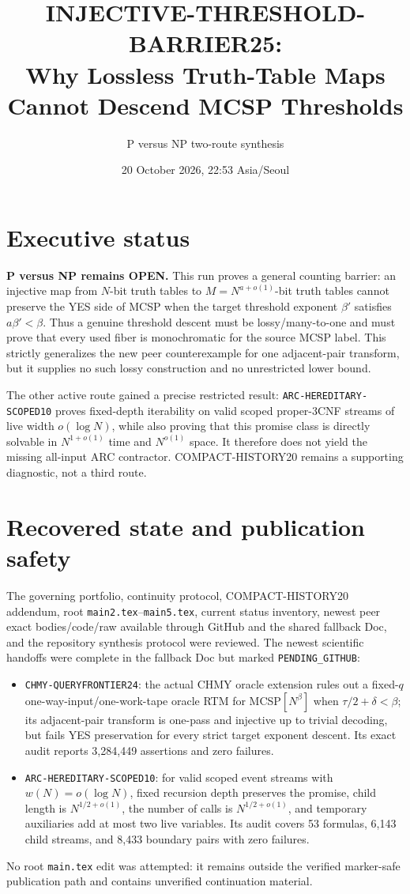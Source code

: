 \documentclass[11pt]{article}
\title{INJECTIVE-THRESHOLD-BARRIER25:\\Why Lossless Truth-Table Maps Cannot Descend MCSP Thresholds}
\author{P versus NP two-route synthesis}
\date{20 October 2026, 22:53 Asia/Seoul}
\begin{document}
\maketitle

\section*{Executive status}
\textbf{P versus NP remains OPEN.} This run proves a general counting barrier:
an injective map from $N$-bit truth tables to $M=N^{a+o(1)}$-bit truth tables
cannot preserve the YES side of MCSP when the target threshold exponent
$\beta'$ satisfies $a\beta'<\beta$.  Thus a genuine threshold descent must be
lossy/many-to-one and must prove that every used fiber is monochromatic for
the source MCSP label.  This strictly generalizes the new peer counterexample
for one adjacent-pair transform, but it supplies no such lossy construction
and no unrestricted lower bound.

The other active route gained a precise restricted result:
\texttt{ARC-HEREDITARY-SCOPED10} proves fixed-depth iterability on valid
scoped proper-3CNF streams of live width $o(\log N)$, while also proving that
this promise class is directly solvable in $N^{1+o(1)}$ time and $N^{o(1)}$
space.  It therefore does not yield the missing all-input ARC contractor.
COMPACT-HISTORY20 remains a supporting diagnostic, not a third route.

\section*{Recovered state and publication safety}
The governing portfolio, continuity protocol, COMPACT-HISTORY20 addendum,
root \texttt{main2.tex}--\texttt{main5.tex}, current status inventory, newest
peer exact bodies/code/raw available through GitHub and the shared fallback
Doc, and the repository synthesis protocol were reviewed.  The newest
scientific handoffs were complete in the fallback Doc but marked
\texttt{PENDING\_GITHUB}:
\begin{itemize}
\item \texttt{CHMY-QUERYFRONTIER24}: the actual CHMY oracle extension rules
out a fixed-$q$ one-way-input/one-work-tape oracle RTM for MCSP$[N^\beta]$
when $\tau/2+\delta<\beta$; its adjacent-pair transform is one-pass and
injective up to trivial decoding, but fails YES preservation for every
strict target exponent descent.  Its exact audit reports 3,284,449
assertions and zero failures.
\item \texttt{ARC-HEREDITARY-SCOPED10}: for valid scoped event streams with
$w(N)=o(\log N)$, fixed recursion depth preserves the promise, child length
is $N^{1/2+o(1)}$, the number of calls is $N^{1/2+o(1)}$, and temporary
auxiliaries add at most two live variables.  Its audit covers 53 formulas,
6,143 child streams, and 8,433 boundary pairs with zero failures.
\end{itemize}
No root \texttt{main.tex} edit was attempted: it remains outside the verified
marker-safe publication path and contains unverified continuation material.
\end{document}
